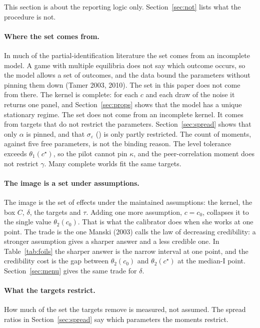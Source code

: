 \documentclass[11pt]{article}
\begin{document}
This section is about the reporting logic only. Section~\ref{sec:not}
lists what the procedure is not.

\paragraph{Where the set comes from.}
In much of the partial-identification literature the set comes from an
incomplete model. A game with multiple equilibria does not say which
outcome occurs, so the model allows a set of outcomes, and the data
bound the parameters without pinning them down (Tamer 2003, 2010). The
set in this paper does not come from there. The kernel is complete:
for each $c$ and each draw of the noise it returns one panel, and
Section~\ref{sec:props} shows that the model has a unique stationary
regime. The set does not come from an incomplete kernel. It comes from targets
that do not restrict the parameters. Section~\ref{sec:spread} shows that
only $\alpha$ is pinned, and that $\sigma_\varepsilon$
(\SpreadRatioSigma) is only partly restricted. The count of moments,
\NMoments{} against five free parameters, is not the binding reason. The
level tolerance exceeds $\theta_1(c^\star)$, so the pilot cannot pin
$\kappa$, and the peer-correlation moment does not restrict $\gamma$.
Many complete worlds fit the same targets.

\paragraph{The image is a set under assumptions.}
The image is the set of effects under the maintained assumptions:
the kernel, the box $C$, $\delta$, the targets and $\tau$. Adding one
more assumption, $c=c_0$, collapses it to the single value
$\theta_2(c_0)$. That is what the calibrator does when she works at one
point. The trade is the one Manski (2003) calls the law of decreasing
credibility: a stronger assumption gives a sharper answer and a less
credible one. In Table~\ref{tab:foils} the sharper answer is the narrow
interval at one point, and the credibility cost is the gap between
$\theta_2(c_0)$ and $\theta_2(c^\star)$ at the median-I point.
Section~\ref{sec:menu} gives the same trade for $\delta$.

\paragraph{What the targets restrict.}
How much of the set the targets remove is measured, not assumed. The
spread ratios in Section~\ref{sec:spread} say which parameters the
moments restrict.
\end{document}
